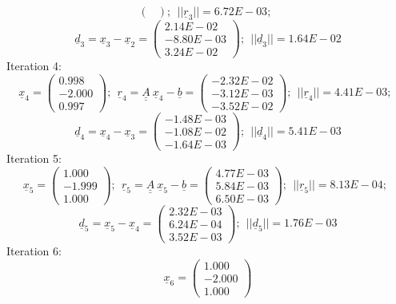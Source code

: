 \documentclass{report}[10pts]
\begin{document}
\begin{small}
\[\begin{pmatrix}
   \end{pmatrix}
;~~
||
\underline{r}_{3}
||=
6.72E-03
;~~
\]
\[
\underline{d}_{3}=
\underline{x}_{3}-
\underline{x}_{2}=
   \begin{pmatrix}
   2.14E-02 \\ -8.80E-03 \\ 3.24E-02
   \end{pmatrix}
;~~
||
\underline{d}_{3}
||=
1.64E-02
\]
Iteration 4:
\[
\underline{x}_{4}=
   \begin{pmatrix}
   0.998 \\ -2.000 \\ 0.997
   \end{pmatrix}
;~~
\underline{r}_{4}=
\underline{\underline{A}}~\underline{x}_{4}-
\underline{b}=
   \begin{pmatrix}
   -2.32E-02 \\ -3.12E-03 \\ -3.52E-02
   \end{pmatrix}
;~~
||
\underline{r}_{4}
||=
4.41E-03
;~~
\]
\[
\underline{d}_{4}=
\underline{x}_{4}-
\underline{x}_{3}=
   \begin{pmatrix}
   -1.48E-03 \\ -1.08E-02 \\ -1.64E-03
   \end{pmatrix}
;~~
||
\underline{d}_{4}
||=
5.41E-03
\]
Iteration 5:
\[
\underline{x}_{5}=
   \begin{pmatrix}
   1.000 \\ -1.999 \\ 1.000
   \end{pmatrix}
;~~
\underline{r}_{5}=
\underline{\underline{A}}~\underline{x}_{5}-
\underline{b}=
   \begin{pmatrix}
   4.77E-03 \\ 5.84E-03 \\ 6.50E-03
   \end{pmatrix}
;~~
||
\underline{r}_{5}
||=
8.13E-04
;~~
\]
\[
\underline{d}_{5}=
\underline{x}_{5}-
\underline{x}_{4}=
   \begin{pmatrix}
   2.32E-03 \\ 6.24E-04 \\ 3.52E-03
   \end{pmatrix}
;~~
||
\underline{d}_{5}
||=
1.76E-03
\]
Iteration 6:
\[
\underline{x}_{6}=
   \begin{pmatrix}
   1.000 \\ -2.000 \\ 1.000
   \end{pmatrix}
\]
\end{small}
\end{document}
